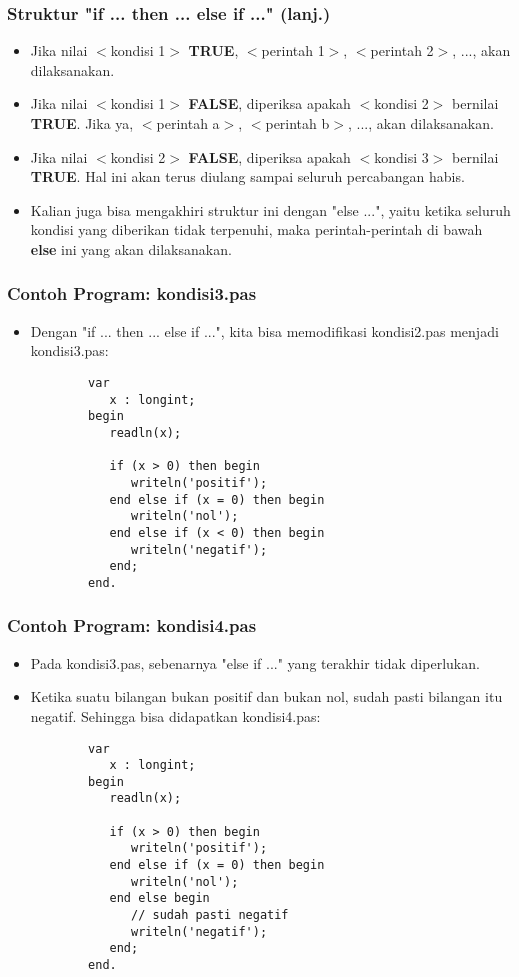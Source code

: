 \documentclass{beamer}
\begin{document}
\begin{frame}
\frametitle{Struktur "if ... then ... else if ..." (lanj.)}
\begin{itemize}
    \item Jika nilai $<$kondisi 1$>$ \textbf{TRUE}, $<$perintah 1$>$, $<$perintah 2$>$, ..., akan dilaksanakan.
    \item Jika nilai $<$kondisi 1$>$ \textbf{FALSE}, diperiksa apakah $<$kondisi 2$>$ bernilai \textbf{TRUE}. Jika ya, $<$perintah a$>$, $<$perintah b$>$, ..., akan dilaksanakan.
    \item Jika nilai $<$kondisi 2$>$ \textbf{FALSE}, diperiksa apakah $<$kondisi 3$>$ bernilai \textbf{TRUE}. Hal ini akan terus diulang sampai seluruh percabangan habis.
    \item Kalian juga bisa mengakhiri struktur ini dengan "else ...", yaitu ketika seluruh kondisi yang diberikan tidak terpenuhi, maka perintah-perintah di bawah \textbf{else} ini yang akan dilaksanakan.
\end{itemize}
\end{frame}

\begin{frame}[fragile]
\frametitle{Contoh Program: kondisi3.pas}
\begin{itemize}
    \item Dengan "if ... then ... else if ...", kita bisa memodifikasi kondisi2.pas menjadi kondisi3.pas:
    \begin{lstlisting}
        var
           x : longint;
        begin
           readln(x);

           if (x > 0) then begin
              writeln('positif');
           end else if (x = 0) then begin
              writeln('nol');
           end else if (x < 0) then begin
              writeln('negatif');
           end;
        end.
    \end{lstlisting}
\end{itemize}
\end{frame}

\begin{frame}[fragile]
\frametitle{Contoh Program: kondisi4.pas}
\begin{itemize}
    \item Pada kondisi3.pas, sebenarnya "else if ..." yang terakhir tidak diperlukan.
    \item Ketika suatu bilangan bukan positif dan bukan nol, sudah pasti bilangan itu negatif. Sehingga bisa didapatkan kondisi4.pas:
    \begin{lstlisting}
        var
           x : longint;
        begin
           readln(x);

           if (x > 0) then begin
              writeln('positif');
           end else if (x = 0) then begin
              writeln('nol');
           end else begin
              // sudah pasti negatif
              writeln('negatif');
           end;
        end.
    \end{lstlisting}
\end{itemize}
\end{frame}
\end{document}
